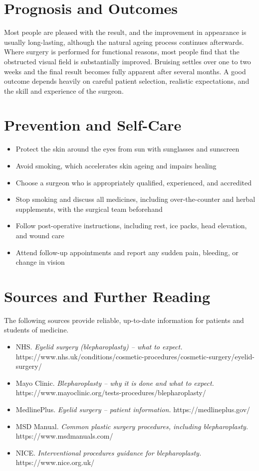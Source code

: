 \section*{Prognosis and Outcomes}
Most people are pleased with the result, and the improvement in appearance is usually long-lasting, although the natural ageing process continues afterwards. Where surgery is performed for functional reasons, most people find that the obstructed visual field is substantially improved. Bruising settles over one to two weeks and the final result becomes fully apparent after several months. A good outcome depends heavily on careful patient selection, realistic expectations, and the skill and experience of the surgeon.

\section*{Prevention and Self-Care}
\begin{itemize}
    \item Protect the skin around the eyes from sun with sunglasses and sunscreen
    \item Avoid smoking, which accelerates skin ageing and impairs healing
    \item Choose a surgeon who is appropriately qualified, experienced, and accredited
    \item Stop smoking and discuss all medicines, including over-the-counter and herbal supplements, with the surgical team beforehand
    \item Follow post-operative instructions, including rest, ice packs, head elevation, and wound care
    \item Attend follow-up appointments and report any sudden pain, bleeding, or change in vision
\end{itemize}

\section*{Sources and Further Reading}
The following sources provide reliable, up-to-date information for patients and students of medicine.

\begin{itemize}
    \item NHS. \textit{Eyelid surgery (blepharoplasty) -- what to expect.} https://www.nhs.uk/conditions/cosmetic-procedures/cosmetic-surgery/eyelid-surgery/
    \item Mayo Clinic. \textit{Blepharoplasty -- why it is done and what to expect.} https://www.mayoclinic.org/tests-procedures/blepharoplasty/
    \item MedlinePlus. \textit{Eyelid surgery -- patient information.} https://medlineplus.gov/
    \item MSD Manual. \textit{Common plastic surgery procedures, including blepharoplasty.} https://www.msdmanuals.com/
    \item NICE. \textit{Interventional procedures guidance for blepharoplasty.} https://www.nice.org.uk/
\end{itemize}
